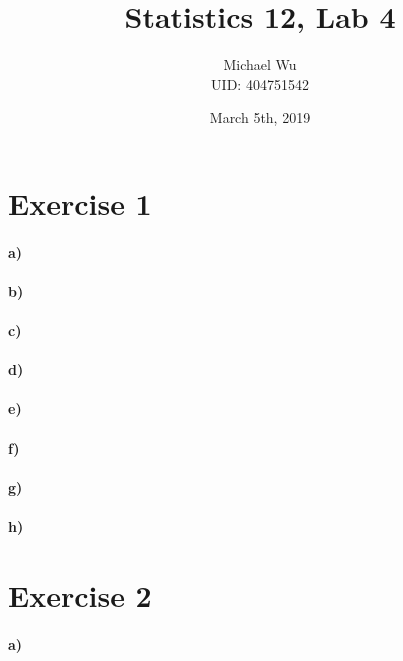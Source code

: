\documentclass[12pt]{article}
\begin{document}
\title{Statistics 12, Lab 4}
\date{March 5th, 2019}
\author{Michael Wu\\UID: 404751542}
\maketitle

\section*{Exercise 1}

\paragraph{a)}

\paragraph{b)}

\paragraph{c)}

\paragraph{d)}

\paragraph{e)}

\paragraph{f)}

\paragraph{g)}

\paragraph{h)}

\section*{Exercise 2}

\paragraph{a)}
\end{document}
